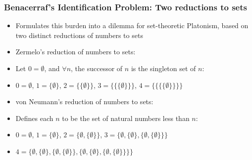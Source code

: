 \begin{frame}
\frametitle{Benacerraf's Identification Problem: Two reductions to sets}

\begin{itemize}[<+->]

\item Formulates this burden into a dilemma for set-theoretic Platonism, based on two distinct reductions of numbers to sets 

\item Zermelo's reduction of numbers to sets:
\item[] Let $0 = \emptyset$, and $\forall n$, the successor of $n$ is the singleton set of $n$:
\item[] $0 = \emptyset$, $1 = \{\emptyset\}$, $2 = \{ \{ \emptyset \} \}$, $3 = \{ \{ \{ \emptyset \} \} \}$, $4 = \{ \{ \{ \{ \emptyset \} \} \} \}$

\item von Neumann's reduction of numbers to sets:
\item[] Defines each $n$ to be the set of natural numbers less than $n$:

\item[] $0 = \emptyset$, $1 = \{\emptyset\}$, $2 = \{\emptyset, \{\emptyset\} \}$, $3 = \{\emptyset, \{\emptyset\}, \{\emptyset, \{\emptyset\} \} \}$

\item[] $4 = \Big\{\emptyset, \{\emptyset\}, \{\emptyset, \{\emptyset\} \}, \big\{\emptyset, \{\emptyset\}, \{\emptyset, \{\emptyset\} \} \big\} \Big\}$



\end{itemize}
\end{frame}

